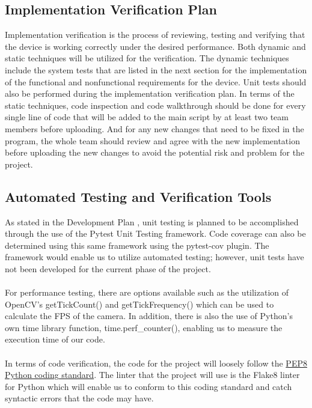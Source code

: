 \documentclass[12pt]{article}
\begin{document}
\subsection{Implementation Verification Plan}
Implementation verification is the process of reviewing, testing and verifying that the device is working correctly under the desired performance. Both dynamic and static techniques will be utilized for the verification. The dynamic techniques include the system tests that are listed in the next section for the implementation of the functional and nonfunctional requirements for the device. 
Unit tests should also be performed during the implementation verification plan. In terms of the static techniques, code inspection and code walkthrough should be done for every single line of code that will be added to the main script by at least two team members before uploading. And for any new changes that need to be fixed in the program, the whole team should review and agree with the new implementation before uploading the new changes to avoid the potential risk and problem for the project.
\subsection{Automated Testing and Verification Tools}

As stated in the Development Plan \citep{DevPlan}, unit testing is planned to be accomplished through the use of the Pytest Unit Testing framework. Code coverage can also 
be determined using this same framework using the pytest-cov plugin. The framework would enable us to utilize automated testing; however, unit tests have 
not been developed for the current phase of the project.\\
~\\
For performance testing, there are options available such as the utilization of OpenCV’s getTickCount() and getTickFrequency() which can be used to 
calculate the FPS of the camera. In addition, there is also the use of Python’s own time library function, time.perf\_counter(), enabling us to measure 
the execution time of our code.\\
~\\
In terms of code verification, the code for the project will loosely follow the \href{https://peps.python.org/pep-0008/}{PEP8 Python coding standard}. 
The linter that the project will use is the Flake8 linter for Python which will enable us to conform to this coding standard and catch syntactic errors that 
the code may have.
\end{document}

